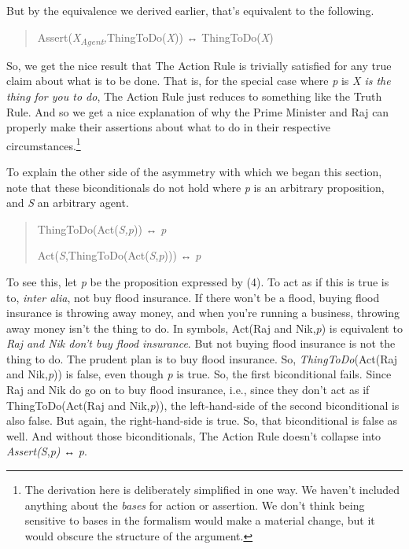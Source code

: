 \documentclass[
  10pt,
  letterpaper,
  DIV=11,
  numbers=noendperiod,
  twoside]{scrartcl}
\begin{document}
But by the equivalence we derived earlier, that's equivalent to the
following.

\begin{quote}
Assert(\emph{X\textsubscript{Agent},}ThingToDo(\emph{X})) ↔
ThingToDo(\emph{X})
\end{quote}

So, we get the nice result that The Action Rule is trivially satisfied
for any true claim about what is to be done. That is, for the special
case where \emph{p} is \emph{X is the thing for you to do}, The Action
Rule just reduces to something like the Truth Rule. And so we get a nice
explanation of why the Prime Minister and Raj can properly make their
assertions about what to do in their respective
circumstances.\footnote{The derivation here is deliberately simplified
  in one way. We haven't included anything about the \emph{bases} for
  action or assertion. We don't think being sensitive to bases in the
  formalism would make a material change, but it would obscure the
  structure of the argument.}

To explain the other side of the asymmetry with which we began this
section, note that these biconditionals do not hold where \emph{p} is an
arbitrary proposition, and \emph{S} an arbitrary agent.

\begin{quote}
ThingToDo(Act(\emph{S,p})) ↔ \emph{p}

Act(\emph{S},ThingToDo(Act(\emph{S},\emph{p}))) ↔ \emph{p}
\end{quote}

To see this, let \emph{p} be the proposition expressed by (4). To act as
if this is true is to, \emph{inter alia}, not buy flood insurance. If
there won't be a flood, buying flood insurance is throwing away money,
and when you're running a business, throwing away money isn't the thing
to do. In symbols, Act(Raj and Nik,\emph{p}) is equivalent to \emph{Raj
and Nik don't buy flood insurance}. But not buying flood insurance is
not the thing to do. The prudent plan is to buy flood insurance. So,
\emph{ThingToDo}(Act(Raj and Nik,\emph{p})) is false, even though
\emph{p} is true. So, the first biconditional fails. Since Raj and Nik
do go on to buy flood insurance, i.e., since they don't act as if
ThingToDo(Act(Raj and Nik,\emph{p})), the left-hand-side of the second
biconditional is also false. But again, the right-hand-side is true. So,
that biconditional is false as well. And without those biconditionals,
The Action Rule doesn't collapse into \emph{Assert(S},\emph{p)} ↔
\emph{p}.
\end{document}
